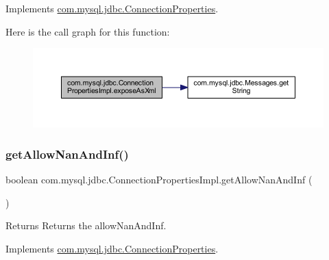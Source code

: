 Implements \mbox{\hyperlink{interfacecom_1_1mysql_1_1jdbc_1_1_connection_properties_a73482b2a70021a34f84dbc38bf1a105a}{com.\+mysql.\+jdbc.\+Connection\+Properties}}.

Here is the call graph for this function\+:\nopagebreak
\begin{figure}[H]
\begin{center}
\leavevmode
\includegraphics[width=350pt]{classcom_1_1mysql_1_1jdbc_1_1_connection_properties_impl_a1f5d852e50bec0d2947c724c9a33f8ee_cgraph}
\end{center}
\end{figure}
\mbox{\label{classcom_1_1mysql_1_1jdbc_1_1_connection_properties_impl_a7a2372abfe7156f94be2443ea7d4f29e}} 
\subsubsection{\texorpdfstring{get\+Allow\+Nan\+And\+Inf()}{getAllowNanAndInf()}}
{\footnotesize\ttfamily boolean com.\+mysql.\+jdbc.\+Connection\+Properties\+Impl.\+get\+Allow\+Nan\+And\+Inf (\begin{DoxyParamCaption}{ }\end{DoxyParamCaption})}

\begin{DoxyReturn}{Returns}
Returns the allow\+Nan\+And\+Inf. 
\end{DoxyReturn}


Implements \mbox{\hyperlink{interfacecom_1_1mysql_1_1jdbc_1_1_connection_properties_a2da790a00e98b06833dc0856c42d638a}{com.\+mysql.\+jdbc.\+Connection\+Properties}}.

\mbox{\label{classcom_1_1mysql_1_1jdbc_1_1_connection_properties_impl_ac1a9cc94289786bd8b327902faf33d73}} 
